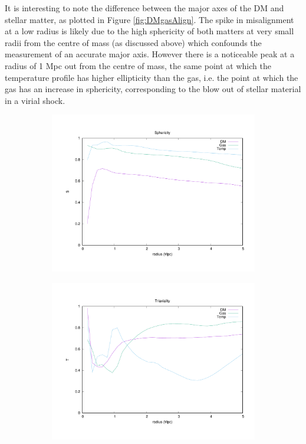 \documentclass[journal]{IEEEtran}
\begin{document}
It is interesting to note the difference between the major axes of the DM and stellar matter, as plotted in Figure \ref{fig:DMgasAlign}. The spike in misalignment at a low radius is likely due to the high sphericity of both matters at very small radii from the centre of mass (as discussed above) which confounds the measurement of an accurate major axis. However there is a noticeable peak at a radius of 1 Mpc out from the centre of mass, the same point at which the temperature profile has higher ellipticity than the gas, i.e. the point at which the gas has an increase in sphericity, corresponding to the blow out of stellar material in a virial shock.

\begin{figure}[!t]
\centering
	\begin{subfigure}[t]{0.3\textwidth}
		\centering
		\includegraphics[width=\linewidth]{Sphericity}
	\end{subfigure}
	\quad
	\begin{subfigure}[t]{0.3\textwidth}
		\centering
		\includegraphics[width=\linewidth]{Triaxiality}

\end{subfigure}
\end{figure}
\end{document}
